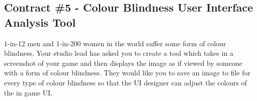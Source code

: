 \documentclass{../../fal_assignment}
\begin{document}
\subsection*{Contract \#5 - Colour Blindness User Interface Analysis Tool}
1-in-12 men and 1-in-200 women in the world suffer some form of colour blindness. Your studio lead has asked you to create a tool which takes in a screenshot of your game and then displays the image as if viewed by someone with a form of colour blindness. They would like you to save an image to file for every type of colour blindness so that the UI designer can adjust the colours of the in game UI.
\end{document}
